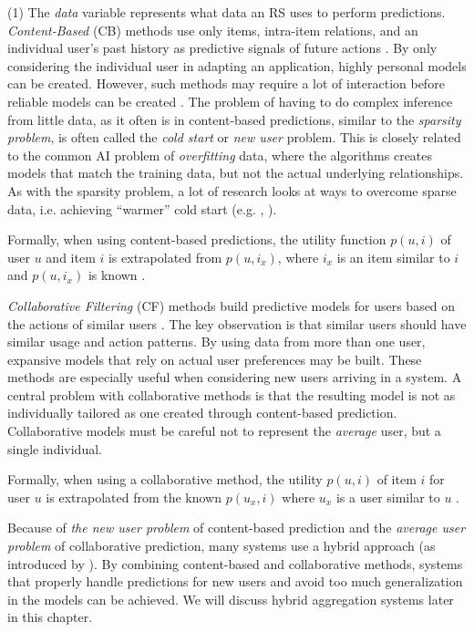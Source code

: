 (1) The \emph{data} variable represents what data an RS uses to perform predictions. 
\emph{Content-Based} (CB) methods use only items, intra-item relations, and 
an individual user's past history as predictive signals of future actions \cite[p1]{Pazzani2007}.
By only considering the individual user in adapting an application, highly personal models can be created. 
However, such methods may require a lot of interaction before reliable models can be created \cite[p4]{Adomavicius2005}.
The problem of having to do complex inference from little data, as it often is in content-based predictions,
similar to the \emph{sparsity problem}, is often called the \emph{cold start} or \emph{new user} problem. 
This is closely related to the common AI problem of \emph{overfitting} data, 
where the algorithms creates models that match the training data, 
but not the actual underlying relationships. 
As with the sparsity problem, a lot of research looks at ways to overcome sparse data, i.e. achieving ``warmer'' cold start
(e.g. \cite{Said2009}, \cite{Lilegraven2011}). 

Formally, when using content-based predictions, the utility function $p(u,i)$ of user $u$ and item $i$ is extrapolated from $p(u,i_x)$, 
where $i_x$ is an item similar to $i$ and $p(u,i_x)$ is known \cite[p2]{Adomavicius2005}.

\emph{Collaborative Filtering} (CF) methods build predictive models for users based on the actions of similar users \citep{Schafer2007}.
The key observation is that similar users should have similar usage and action patterns. 
By using data from more than one user, expansive models that rely on actual user preferences may be built. 
These methods are especially useful when considering new users arriving in a system. 
A central problem with collaborative methods is that the resulting model is not as individually tailored as one created through content-based prediction. 
Collaborative models must be careful not to represent the \emph{average} user, but a single individual.

Formally, when using a collaborative method, 
the utility $p(u,i)$ of item $i$ for user $u$ is extrapolated from the known $p(u_x,i)$ where $u_x$ is a user similar to $u$
\cite[p4]{Adomavicius2005}. 

Because of \emph{the new user problem} of content-based prediction and the \emph{average user problem} of collaborative prediction, 
many systems use a hybrid approach (as introduced by \cite{Burke2007}).
By combining content-based and collaborative methods, 
systems that properly handle predictions for new users and avoid too much generalization in the models can be achieved. 
We will discuss hybrid aggregation systems later in this chapter.

